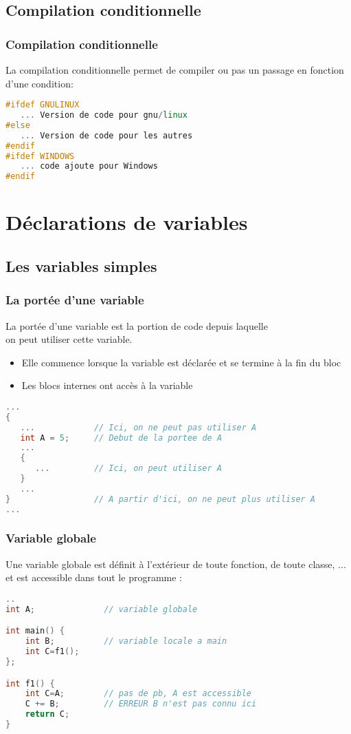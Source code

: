 \documentclass{beamer}
\begin{document}
\subsection{Compilation conditionnelle}

\begin{frame}[fragile=singleslide,shrink=20]
\frametitle {Compilation conditionnelle}
La compilation conditionnelle permet de compiler ou pas un passage en fonction 
d'une condition:
\begin{lstlisting}[language=c++]
#ifdef GNULINUX
   ... Version de code pour gnu/linux
#else
   ... Version de code pour les autres
#endif
#ifdef WINDOWS
   ... code ajoute pour Windows
#endif
\end{lstlisting}
\end{frame}



\section{Déclarations de variables}



\subsection{Les variables simples}

\begin{frame}[fragile=singleslide,shrink=20]
\frametitle {La portée d'une variable}
La portée d'une variable est la portion de code depuis laquelle \\
on peut utiliser cette variable. \\
\begin{itemize}
\item{Elle commence lorsque la variable est déclarée et se termine à la fin du bloc}
\item{Les blocs internes ont accès à la variable}
\end{itemize}

\begin{lstlisting}[language=c++]
...
{
   ...            // Ici, on ne peut pas utiliser A
   int A = 5;     // Debut de la portee de A
   ...
   {
      ...         // Ici, on peut utiliser A
   }
   ...
}                 // A partir d'ici, on ne peut plus utiliser A 
...
\end{lstlisting}
\end{frame}

\begin{frame}[fragile=singleslide,shrink=20]
\frametitle {Variable globale}
Une variable globale est définit à l'extérieur de toute fonction, de toute classe, ... et est accessible dans tout le programme :
\begin{lstlisting}[language=c++]
..
int A;  			// variable globale

int main() {
	int B;			// variable locale a main
	int C=f1();
};

int f1() {          
	int C=A;		// pas de pb, A est accessible
	C += B;			// ERREUR B n'est pas connu ici
	return C;
}

\end{lstlisting}

\end{frame}
\end{document}
